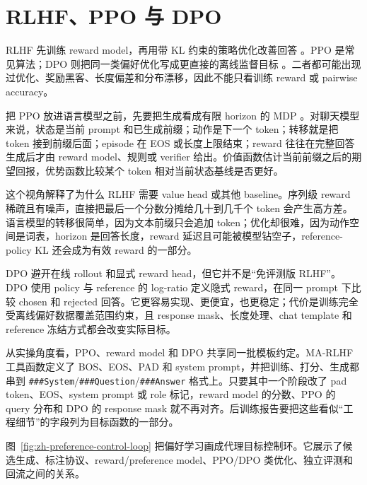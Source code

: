\documentclass[UTF8,zihao=-4,openany]{ctexbook}
\begin{document}
\section{RLHF、PPO 与 DPO}
RLHF 先训练 reward model，再用带 KL 约束的策略优化改善回答 \cite{ziegler2019finetuning,stiennon2020learning,ouyang2022training}。PPO 是常见算法；DPO 则把同一类偏好优化写成更直接的离线监督目标 \cite{schulman2017proximal,rafailov2023direct}。二者都可能出现过优化、奖励黑客、长度偏差和分布漂移，因此不能只看训练 reward 或 pairwise accuracy。

把 PPO 放进语言模型之前，先要把生成看成有限 horizon 的 MDP \cite{sutton2018reinforcement}。对聊天模型来说，状态是当前 prompt 和已生成前缀；动作是下一个 token；转移就是把 token 接到前缀后面；episode 在 EOS 或长度上限结束；reward 往往在完整回答生成后才由 reward model、规则或 verifier 给出。价值函数估计当前前缀之后的期望回报，优势函数比较某个 token 相对当前状态基线是否更好。

这个视角解释了为什么 RLHF 需要 value head 或其他 baseline。序列级 reward 稀疏且有噪声，直接把最后一个分数分摊给几十到几千个 token 会产生高方差。语言模型的转移很简单，因为文本前缀只会追加 token；优化却很难，因为动作空间是词表，horizon 是回答长度，reward 延迟且可能被模型钻空子，reference-policy KL 还会成为有效 reward 的一部分。

DPO 避开在线 rollout 和显式 reward head，但它并不是“免评测版 RLHF”。DPO 使用 policy 与 reference 的 log-ratio 定义隐式 reward，在同一 prompt 下比较 chosen 和 rejected 回答。它更容易实现、更便宜，也更稳定；代价是训练完全受离线偏好数据覆盖范围约束，且 response mask、长度处理、chat template 和 reference 冻结方式都会改变实际目标。

从实操角度看，PPO、reward model 和 DPO 共享同一批模板约定。MA-RLHF 工具函数定义了 BOS、EOS、PAD 和 system prompt，并把训练、打分、生成都串到 \texttt{\#\#\#System}/\texttt{\#\#\#Question}/\texttt{\#\#\#Answer} 格式上。只要其中一个阶段改了 pad token、EOS、system prompt 或 role 标记，reward model 的分数、PPO 的 query 分布和 DPO 的 response mask 就不再对齐。后训练报告要把这些看似“工程细节”的字段列为目标函数的一部分。

图~\ref{fig:zh-preference-control-loop} 把偏好学习画成代理目标控制环。它展示了候选生成、标注协议、reward/preference model、PPO/DPO 类优化、独立评测和回流之间的关系。
\end{document}
